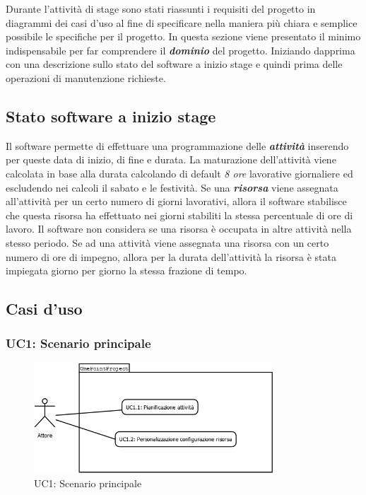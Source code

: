 Durante l\textquoteright{}attivit\`{a} di stage sono stati riassunti i requisiti del progetto in diagrammi dei casi d\textquoteright{}uso al fine di specificare nella maniera pi\`{u} chiara e semplice possibile le specifiche per il progetto. In questa sezione viene presentato il minimo indispensabile per far comprendere il \textit{\textbf{dominio}} del progetto. Iniziando dapprima con una descrizione sullo stato del software a inizio stage e quindi prima delle operazioni di manutenzione richieste.

\subsection{Stato software a inizio stage}
Il software permette di effettuare una programmazione delle \textit{\textbf{attivit\`{a}}} inserendo per queste data di inizio, di fine e durata. La maturazione dell\textquoteright{}attivit\`{a} viene calcolata in base alla durata calcolando di default \textit{8 ore} lavorative giornaliere ed escludendo nei calcoli il sabato e le festivit\`{a}. Se una \textit{\textbf{risorsa}} viene assegnata all\textquoteright{}attivit\`{a} per un certo numero di giorni lavorativi, allora il software stabilisce che questa risorsa ha effettuato nei giorni stabiliti la stessa percentuale di ore di lavoro. Il software non considera se una risorsa \`{e} occupata in altre attivit\`{a} nella stesso periodo. Se ad una attivit\`{a} viene assegnata una risorsa con un certo numero di ore di impegno, allora per la durata dell\textquoteright{}attivit\`{a} la risorsa \`{e} stata impiegata giorno per giorno la stessa frazione di tempo.

\subsection{Casi d\textquoteright{}uso}

\subsubsection[UC1: Scenario principale]{UC1: Scenario principale}
\begin{figure}[H]
\begin{center}
\includegraphics[width=0.80\textwidth]{img/UC/UC1.png}
\caption{UC1: Scenario principale}
\label{fig:UC1}
\end{center}
\end{figure}

